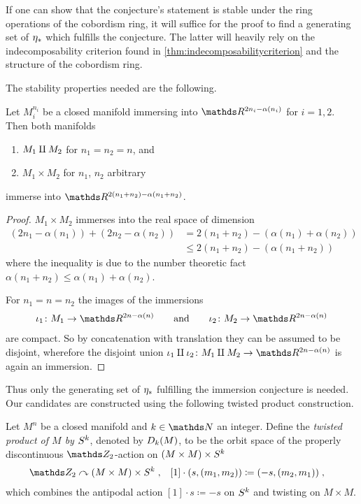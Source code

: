 If one can show that the conjecture's statement is stable
under the ring operations of the cobordism ring, it will suffice for
the proof to find a generating set of $\c_*$ which fulfills the conjecture.
The latter will heavily rely on the indecomposability criterion found
in \autoref{thm:indecomposabilitycriterion} and the structure of the
cobordism ring.

The stability properties needed are the following.
\begin{Lem}
  Let $M_i^{n_i}$ be a closed manifold immersing into
  $\R^{2n_i-\alpha(n_i)}$ for $i=1,2$.
  Then both manifolds
  \begin{enumerate}
  \item $M_1\disjointsum M_2$ for $n_1=n_2=n$, and
  \item $M_1\times M_2$ for $n_1$, $n_2$ arbitrary
  \end{enumerate}
  immerse into $\R^{2(n_1+n_2)-\alpha(n_1+n_2)}$.
  \begin{proof}
    $M_1\times M_2$ immerses into the real space of dimension
    \begin{align*}
      \left( 2n_1-\alpha(n_1) \right)
      + \left( 2n_2-\alpha(n_2) \right)
      &= 2(n_1+n_2) - \left(\alpha(n_1)+\alpha(n_2)\right)\\
      &\leq 2(n_1+n_2) - \left(\alpha(n_1 + n_2)\right)
    \end{align*}
    where the inequality is due to the number theoretic fact
    $\alpha(n_1+n_2) \leq \alpha(n_1)+\alpha(n_2)$.

    For $n_1=n=n_2$ the images of the immersions
    \begin{gather*}
      \iota_1\colon M_1\to\R^{2n-\alpha(n)}
      \qquad \text{and} \qquad
      \iota_2\colon M_2\to\R^{2n-\alpha(n)}
    \end{gather*}
    are compact. So by
    concatenation with translation they can be assumed to be disjoint,
    wherefore the disjoint union
    $\iota_1\disjointsum\iota_2\colon M_1\disjointsum M_2\to\R^{2n-\alpha(n)}$
    is again an immersion.
  \end{proof}
\end{Lem}

Thus only the generating set of $\c_*$ fulfilling the immersion
conjecture is needed.
Our candidates are constructed using the following twisted product
construction.

\begin{Def}
  Let $M^n$ be a closed manifold and $k\in\Nat$ an integer.
  Define the \emph{twisted product of $M$ by $\Sphere k$}, denoted by
  $\Twistedprod{k}{M}$, to be the orbit space of the properly
  discontinuous $\Zmod2$-action on $\Twistedprodcovspace{k}{M}$
  \begin{align*}
    \Zmod2 &\leftgroupaction \Twistedprodcovspace{k}{M}
             \;,
    &[1] \cdot (s, (m_1,m_2)) &\coloneqq (-s, (m_2, m_1))
                                \;,
  \end{align*}
  which combines the antipodal action $[1]\cdot s\coloneqq -s$ on
  $\Sphere k$ and twisting on $M\times M$.
\end{Def}

